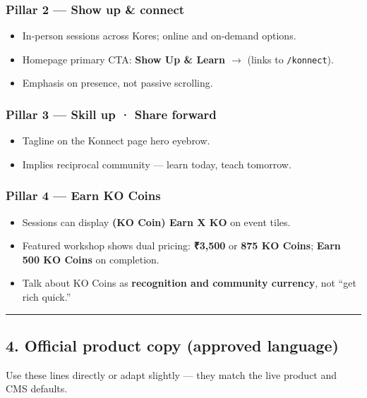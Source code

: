 \documentclass[11pt,a4paper]{report}
\begin{document}
\subsubsection{Pillar 2 --- Show up \& connect}
\begin{itemize}
  \item In-person sessions across Kores; online and on-demand options.
  \item Homepage primary CTA: \textbf{Show Up \& Learn $\rightarrow$} (links to \texttt{/konnect}).
  \item Emphasis on presence, not passive scrolling.
\end{itemize}

\subsubsection{Pillar 3 --- Skill up · Share forward}
\begin{itemize}
  \item Tagline on the Konnect page hero eyebrow.
  \item Implies reciprocal community --- learn today, teach tomorrow.
\end{itemize}

\subsubsection{Pillar 4 --- Earn KO Coins}
\begin{itemize}
  \item Sessions can display \textbf{(KO Coin) Earn X KO} on event tiles.
  \item Featured workshop shows dual pricing: \textbf{₹3,500} or \textbf{875 KO Coins}; \textbf{Earn 500 KO Coins} on completion.
  \item Talk about KO Coins as \textbf{recognition and community currency}, not “get rich quick.”
\end{itemize}

\medskip\hrule\medskip

\subsection{4. Official product copy (approved language)}

Use these lines directly or adapt slightly --- they match the live product and CMS defaults.
\end{document}
